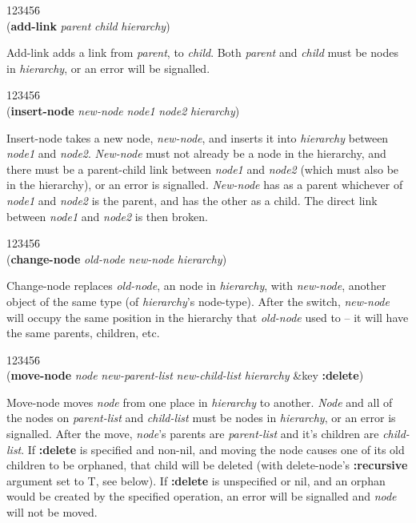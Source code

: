 \begin{tabbing}
123456\= \kill
\\
({\bf add-link} {\it parent\/} {\it child\/} {\it hierarchy\/}) 
\end{tabbing}
Add-link adds a link from {\it parent}, to {\it child}. Both {\it
parent} and {\it child} must be nodes in {\it hierarchy\/}, or an error
will be signalled.


\begin{tabbing}
123456\= \kill
\\
({\bf insert-node} {\it new-node\/} {\it node1\/} {\it node2\/} {\it hierarchy\/})
\end{tabbing}
Insert-node takes a new node, {\it new-node}, and inserts it into {\it
hierarchy} between {\it node1} and {\it node2}. {\it New-node} must not
already be a node in the hierarchy, and there must be a parent-child
link between {\it node1} and {\it node2} (which must also be in the
hierarchy), or an error is signalled. {\it New-node} has as a parent
whichever of {\it node1} and {\it node2} is the parent, and has the
other as a child. The direct link between {\it node1} and {\it node2} is
then broken.

\begin{tabbing}
123456\= \kill
\\
({\bf change-node} {\it old-node\/} {\it new-node\/} {\it hierarchy\/}) 
\end{tabbing}
Change-node replaces {\it old-node}, an node in {\it hierarchy}, with
{\it new-node}, another object of the same type (of {\it
hierarchy\/}'s node-type). After the switch, {\it new-node} will
occupy the same position in the hierarchy that {\it old-node} used to
-- it will have the same parents, children, etc.

\begin{tabbing}
123456\= \kill
\\
({\bf move-node} {\it node\/} {\it new-parent-list\/} {\it
new-child-list\/} {\it hierarchy\/} \&key {\bf :delete}) 
\end{tabbing}
Move-node moves {\it node} from one place in {\it hierarchy} to
another. {\it Node} and all of the nodes on {\it parent-list} and {\it
child-list} must be nodes in {\it hierarchy\/}, or an error is
signalled.  After the move, {\it node\/}'s parents are {\it
parent-list} and it's children are {\it child-list\/}. If {\bf
:delete} is specified and non-nil, and moving the node causes one of
its old children to be orphaned, that child will be deleted (with
delete-node's {\bf :recursive} argument set to T, see below). If {\bf
:delete} is unspecified or nil, and an orphan would be created by the
specified operation, an error will be signalled and {\it node} will
not be moved.

